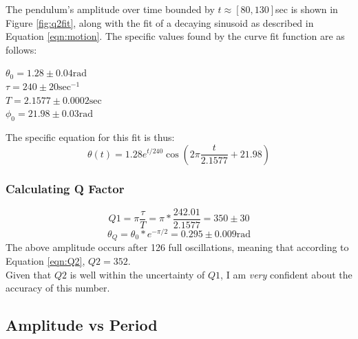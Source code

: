 \documentclass[12pt]{article}
\begin{document}
The pendulum's amplitude over time bounded by $t \approx [80,130]$sec is shown in Figure \ref{fig:q2fit}, along with the fit of a decaying sinusoid as described in Equation \ref{eqn:motion}.
The specific values found by the curve fit function are as follows:
\begin{center}
    $
    \theta_0= 1.28 \pm 0.04\text{rad}$\\$
    \tau= 240 \pm 20\text{sec}^{-1}$\\$
    T= 2.1577 \pm 0.0002\text{sec}$\\$
    \phi_0= 21.98 \pm 0.03\text{rad}
    $
\end{center}
The specific equation for this fit is thus:
\begin{equation}
    \theta(t) = 1.28e^{t/240}\cos(2\pi\frac t{2.1577} + 21.98)
\end{equation}

\subsubsection{Calculating Q Factor}

\begin{equation}
    \label{eqn:Q1calc}
    Q1 = \pi \frac \tau T =\pi*\frac{242.01}{2.1577} = 350 \pm 30
\end{equation}
\begin{equation}
    \label{eqn:Q2calc}
    \theta_Q = \theta_0*e^{-\pi/2} = 0.295\pm0.009\text{rad}
\end{equation}
The above amplitude occurs after 126 full oscillations, meaning that according to Equation \ref{eqn:Q2}, $Q2 = 352$.\medskip\\

Given that $Q2$ is well within the uncertainty of $Q1$, I am \emph{very} confident about the accuracy of this number.

\pagebreak

\subsection{Amplitude vs Period}
\label{section:q3}
\end{document}
